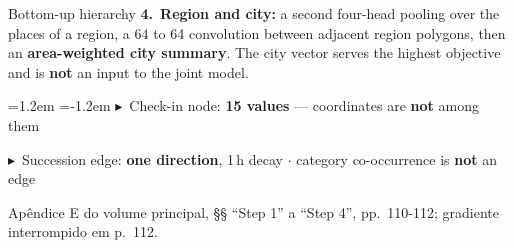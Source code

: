 \documentclass{beamer}
\begin{document}
\begin{frame}[noframenumbering]{Bottom-up hierarchy}
    \textbf{4.}~\textbf{Region and city:} a second four-head pooling over the places of a region, a 64 to 64 convolution between adjacent region polygons, then an \textbf{area-weighted city summary}. The city vector serves the highest objective and is \textbf{not} an input to the joint model.\par
    \leftskip=0pt \parindent=0pt
    \vspace{0.2mm}
    {\footnotesize\leftskip=1.2em \parindent=-1.2em
    \textcolor{primary}{$\blacktriangleright$}~Check-in node: \textbf{15 values} --- coordinates are \textbf{not} among them\par
    \textcolor{primary}{$\blacktriangleright$}~Succession edge: \textbf{one direction}, 1\,h decay $\cdot$ category co-occurrence is \textbf{not} an edge\par}
    \leftskip=0pt \parindent=0pt
    \vfill
    {\scriptsize
    \begin{minipage}[b]{0.775\linewidth}\raggedright\textcolor{black!70}{Apêndice E do volume principal, §§ ``Step 1'' a ``Step 4'', pp.~110-112; gradiente interrompido em p.~112.}\end{minipage}\hfill
    \begin{minipage}[b]{0.20\linewidth}\raggedleft \hyperlink{b0}{}\end{minipage}}
\end{frame}
\end{document}
